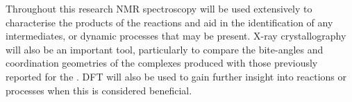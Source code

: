 Throughout this research \gls{NMR} spectroscopy will be used extensively to characterise the products of the reactions and aid in the identification of any intermediates, or dynamic processes that may be present.  X-ray crystallography will also be an important tool, particularly to compare the bite-angles and coordination geometries of the \tBuxantphos{} complexes produced with those previously reported for the \Phxantphos.  \Gls{DFT} will also be used to gain further insight into reactions or processes when this is considered beneficial.


%
%
%
